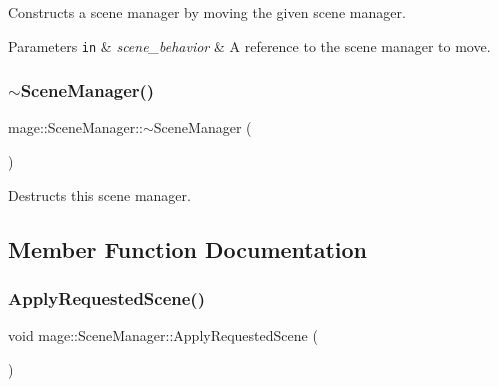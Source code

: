 Constructs a scene manager by moving the given scene manager.


\begin{DoxyParams}[1]{Parameters}
\mbox{\tt in}  & {\em scene\+\_\+behavior} & A reference to the scene manager to move. \\
\hline
\end{DoxyParams}
\hypertarget{classmage_1_1_scene_manager_a849386b052d6ae8945c9554f888e1707}{}\label{classmage_1_1_scene_manager_a849386b052d6ae8945c9554f888e1707} 
\subsubsection{\texorpdfstring{$\sim$\+Scene\+Manager()}{~SceneManager()}}
{\footnotesize\ttfamily mage\+::\+Scene\+Manager\+::$\sim$\+Scene\+Manager (\begin{DoxyParamCaption}{ }\end{DoxyParamCaption})\hspace{0.3cm}{\ttfamily [default]}}

Destructs this scene manager. 

\subsection{Member Function Documentation}
\hypertarget{classmage_1_1_scene_manager_adadc65dc4bd9643c1befd261903309f7}{}\label{classmage_1_1_scene_manager_adadc65dc4bd9643c1befd261903309f7} 
\subsubsection{\texorpdfstring{Apply\+Requested\+Scene()}{ApplyRequestedScene()}}
{\footnotesize\ttfamily void mage\+::\+Scene\+Manager\+::\+Apply\+Requested\+Scene (\begin{DoxyParamCaption}{ }\end{DoxyParamCaption})\hspace{0.3cm}{\ttfamily [private]}}

\hypertarget{classmage_1_1_scene_manager_a6d97c0fb7945aeb53ec950e62567c1f4}{}\label{classmage_1_1_scene_manager_a6d97c0fb7945aeb53ec950e62567c1f4} 
